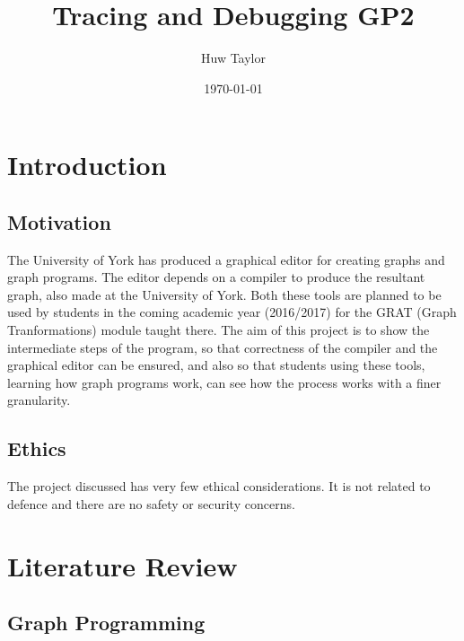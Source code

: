 \documentclass{UoYCSproject}
\author{Huw Taylor}
\title{Tracing and Debugging GP2}
\date{\today}
\begin{document}
\maketitle
\tableofcontents

\chapter{Introduction}
\section{Motivation}
The University of York has produced a graphical editor for creating graphs and graph programs. The editor depends on a compiler to produce the resultant graph, also made at the University of York. Both these tools are planned to be used by students in the coming academic year (2016/2017) for the GRAT (Graph Tranformations) module taught there.
The aim of this project is to show the intermediate steps of the program, so that correctness of the compiler and the graphical editor can be ensured, and also so that students using these tools, learning how graph programs work, can see how the process works with a finer granularity.
\section{Ethics}
The project discussed has very few ethical considerations. It is not related to defence and there are no safety or security concerns.

\chapter{Literature Review}
\section{Graph Programming}
\end{document}
